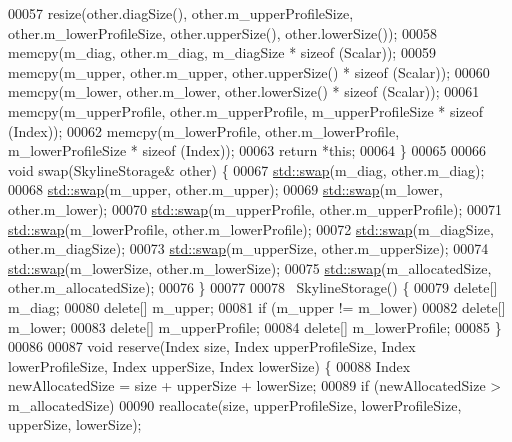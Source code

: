 \begin{DoxyCode}
00057         resize(other.diagSize(), other.m\_upperProfileSize, other.m\_lowerProfileSize, other.upperSize(), 
      other.lowerSize());
00058         memcpy(m\_diag, other.m\_diag, m\_diagSize * sizeof (Scalar));
00059         memcpy(m\_upper, other.m\_upper, other.upperSize() * \textcolor{keyword}{sizeof} (Scalar));
00060         memcpy(m\_lower, other.m\_lower, other.lowerSize() * \textcolor{keyword}{sizeof} (Scalar));
00061         memcpy(m\_upperProfile, other.m\_upperProfile, m\_upperProfileSize * sizeof (Index));
00062         memcpy(m\_lowerProfile, other.m\_lowerProfile, m\_lowerProfileSize * sizeof (Index));
00063         \textcolor{keywordflow}{return} *\textcolor{keyword}{this};
00064     \}
00065 
00066     \textcolor{keywordtype}{void} swap(SkylineStorage& other) \{
00067         \hyperlink{endian_8c_a3ca5ecd34b04d6a243c054ac3a57f68d}{std::swap}(m\_diag, other.m\_diag);
00068         \hyperlink{endian_8c_a3ca5ecd34b04d6a243c054ac3a57f68d}{std::swap}(m\_upper, other.m\_upper);
00069         \hyperlink{endian_8c_a3ca5ecd34b04d6a243c054ac3a57f68d}{std::swap}(m\_lower, other.m\_lower);
00070         \hyperlink{endian_8c_a3ca5ecd34b04d6a243c054ac3a57f68d}{std::swap}(m\_upperProfile, other.m\_upperProfile);
00071         \hyperlink{endian_8c_a3ca5ecd34b04d6a243c054ac3a57f68d}{std::swap}(m\_lowerProfile, other.m\_lowerProfile);
00072         \hyperlink{endian_8c_a3ca5ecd34b04d6a243c054ac3a57f68d}{std::swap}(m\_diagSize, other.m\_diagSize);
00073         \hyperlink{endian_8c_a3ca5ecd34b04d6a243c054ac3a57f68d}{std::swap}(m\_upperSize, other.m\_upperSize);
00074         \hyperlink{endian_8c_a3ca5ecd34b04d6a243c054ac3a57f68d}{std::swap}(m\_lowerSize, other.m\_lowerSize);
00075         \hyperlink{endian_8c_a3ca5ecd34b04d6a243c054ac3a57f68d}{std::swap}(m\_allocatedSize, other.m\_allocatedSize);
00076     \}
00077 
00078     ~SkylineStorage() \{
00079         \textcolor{keyword}{delete}[] m\_diag;
00080         \textcolor{keyword}{delete}[] m\_upper;
00081         \textcolor{keywordflow}{if} (m\_upper != m\_lower)
00082             \textcolor{keyword}{delete}[] m\_lower;
00083         \textcolor{keyword}{delete}[] m\_upperProfile;
00084         \textcolor{keyword}{delete}[] m\_lowerProfile;
00085     \}
00086 
00087     \textcolor{keywordtype}{void} reserve(Index size, Index upperProfileSize, Index lowerProfileSize, Index upperSize, Index 
      lowerSize) \{
00088         Index newAllocatedSize = size + upperSize + lowerSize;
00089         \textcolor{keywordflow}{if} (newAllocatedSize > m\_allocatedSize)
00090             reallocate(size, upperProfileSize, lowerProfileSize, upperSize, lowerSize);

\end{DoxyCode}

